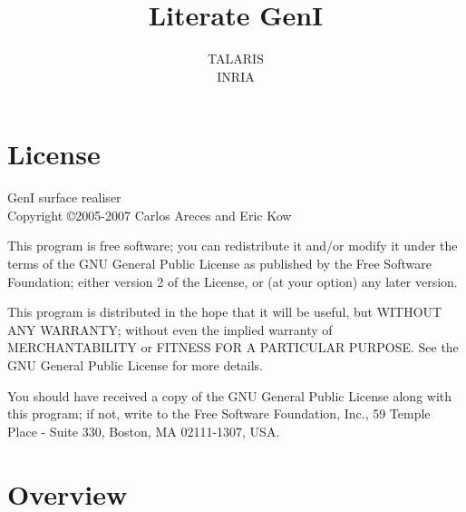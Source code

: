 \documentclass[a4paper,11pt]{report}
\begin{document}
\title{Literate GenI}
\author{TALARIS\\INRIA}

\maketitle
\tableofcontents


\chapter*{License}

GenI surface realiser\\
Copyright \copyright 2005-2007 Carlos Areces and Eric Kow

\bigskip

This program is free software; you can redistribute it and/or
modify it under the terms of the GNU General Public License
as published by the Free Software Foundation; either version 2
of the License, or (at your option) any later version.

\bigskip

This program is distributed in the hope that it will be useful,
but WITHOUT ANY WARRANTY; without even the implied warranty of
MERCHANTABILITY or FITNESS FOR A PARTICULAR PURPOSE.  See the
GNU General Public License for more details.

\bigskip

You should have received a copy of the GNU General Public License
along with this program; if not, write to the Free Software
Foundation, Inc., 59 Temple Place - Suite 330, Boston, MA  02111-1307, USA.

\chapter{Overview}
\end{document}
